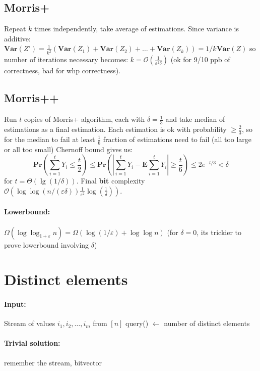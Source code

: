 \documentclass[11pt]{article}
\newcommand{\Ppb}{\mathbf{Pr}}
\newcommand{\Es}{\mathbf{E}}
\newcommand{\bigo}{\mathcal{O}}
\newcommand{\Var}{\mathbf{Var}}
\begin{document}
\subsection{Morris+}
Repeat $k$ times independently, take average of estimations.
Since variance is additive: $\Var(Z') = \frac{1}{k^2}  (\Var(Z_1) + \Var(Z_2) + \dots + \Var(Z_k)) = 1/k  \Var(Z)$ so number of iterations necessary becomes: $k = \bigo(\frac{1}{\varepsilon^2 \delta})$
(ok for 9/10 ppb of correctness, bad for whp correctness).

\subsection{Morris++}
Run $t$ copies of Morris+ algorithm, each with $\delta = \frac{1}{3}$ and take median of estimations as a final estimation. Each estimation is ok with probability $\geq \frac{2}{3}$, so for the median to fail at least $\frac{1}{6}$ fraction of estimations need to fail (all too large or all too small)
Chernoff bound gives us:
\begin{equation}
\Ppb \left(\sum_{i=1}^{t} Y_{i} \leq \frac{t}{2}\right) \leq \Ppb \left(\left|\sum_{i=1}^{t} Y_{i}-\Es \sum_{i=1}^{t} Y_{i}\right| \geq \frac{t}{6}\right) \leq 2 e^{-t / 3}<\delta
\end{equation}
for $t = \Theta(\lg (1 / \delta))$.
Final \textbf{bit} complexity $\bigo(\log \log (n/(\varepsilon \delta)) \frac{1}{\varepsilon^2} \log(\frac{1}{\delta}))$.

\paragraph{Lowerbound:} $\Omega(\log \log_{1+\varepsilon} n) = \Omega(\log(1/\varepsilon) + \log \log n)$ (for $\delta=0$, its trickier to prove lowerbound involving $\delta$)


\section{Distinct elements}

\paragraph{Input:} Stream of values $i_1, i_2, …, i_m$ from $[n]$
query() $\leftarrow$ number of distinct elements

\paragraph{Trivial solution:} remember the stream, bitvector
\end{document}
